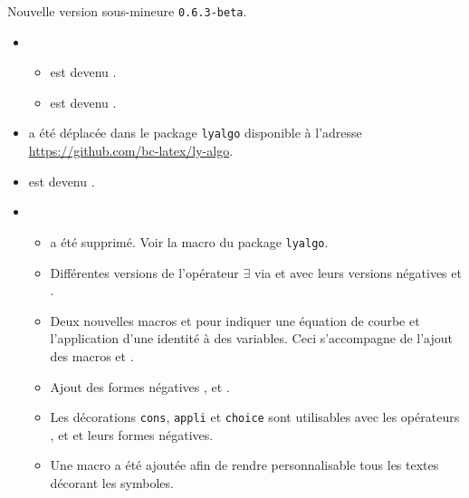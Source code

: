 Nouvelle version sous-mineure \verb+0.6.3-beta+.

\begin{itemize}[itemsep=.5em]
    \item {}
    \begin{itemize}[itemsep=.5em]
        \item {} est devenu .

        \item {} est devenu .
    \end{itemize}




    \item {}
           a été déplacée dans le package \verb+lyalgo+ disponible à l'adresse \url{https://github.com/bc-latex/ly-algo}.




    \item {}
           est devenu .




    \item {}
    \begin{itemize}[itemsep=.5em]
        \item {} a été supprimé. Voir la macro  du package \verb+lyalgo+.

        \item Différentes versions de l'opérateur $\exists$ via  et  avec leurs versions négatives  et .

        \item Deux nouvelles macros  et  pour indiquer une équation de courbe et l'application d'une identité à des variables. Ceci s'accompagne de l'ajout des macros  et .

        \item Ajout des formes négatives ,  et .

        \item Les décorations \verb+cons+, \verb+appli+ et \verb+choice+ sont utilisables avec les opérateurs ,  et  et leurs formes négatives.

        \item Une macro  a été ajoutée afin de rendre personnalisable tous les textes décorant les symboles.
    \end{itemize}
\end{itemize}
